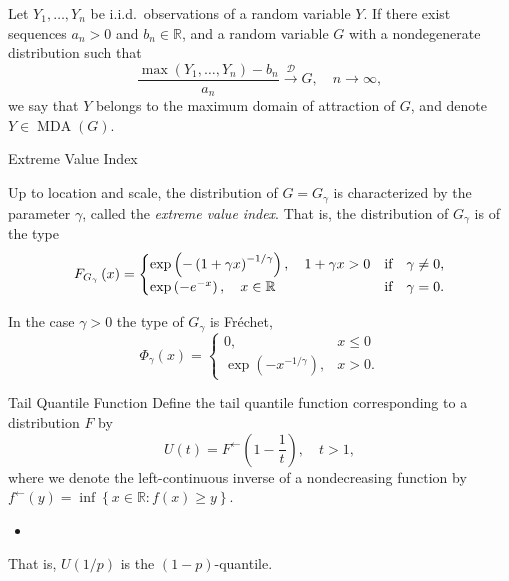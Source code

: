 \documentclass[11pt, aspectratio=169]{beamer}
\DeclareMathOperator{\mda}{MDA}
\begin{document}
\begin{frame}
  \begin{definition}
    Let $Y_1, \ldots, Y_n$ be i.i.d.\ observations of a random variable $Y$. If
    there exist sequences $a_n > 0$ and $b_n\in\mathbb{R}$, and a random
    variable $G$ with a nondegenerate distribution such that
    \begin{equation*}
	    \frac{\max\left(Y_1, \ldots, Y_n\right) - b_n}{a_n}
      \stackrel{\mathcal{D}}{\to} G, \quad n\to\infty,
    \end{equation*}
    we say that $Y$ belongs to the maximum domain of attraction of $G$, and
    denote $Y\in\mda\left(G\right)$.
  \end{definition}
\end{frame}


\begin{frame}{Extreme Value Index}
  \begin{theorem}
    Up to location and scale, the distribution of $G = G_\gamma$ is
    characterized by the parameter $\gamma$, called the \emph{extreme value
    index}. That is, the distribution of ${G_\gamma}$ is of the type
    \begin{equation*}
      F_{G_\gamma}\left(x\right) =
      \begin{cases}
        \exp\left(-\left(1 + \gamma x\right)^{-1/\gamma}\right),
        \quad 1 + \gamma x > 0 &\textnormal{if}\quad \gamma\neq 0, \\
        \exp\left(-e^{-x}\right),
        \quad x\in\mathbb{R} &\textnormal{if}\quad \gamma = 0.
      \end{cases}
    \end{equation*}
  \end{theorem}
  \pause
  In the case $\gamma > 0$ the type of $G_\gamma$ is Fr\'echet,
  \begin{equation*}
    \Phi_\gamma\left(x\right) =
    \begin{cases}
      0, & x\leq 0 \\
      \exp\left(-x^{-1/\gamma}\right), & x > 0.
    \end{cases}
  \end{equation*}
\end{frame}


\begin{frame}{Tail Quantile Function}
  Define the tail quantile function corresponding to a distribution $F$ by
  \begin{equation*}
    U\left(t\right) = F^{\leftarrow}\left(1 - \frac{1}{t}\right), \quad t > 1,
  \end{equation*}
  where we denote the left-continuous inverse of a nondecreasing function by
  $f^\leftarrow\left(y\right) = \inf\left\{x\in\mathbb{R} : f(x) \geq
  y\right\}$.
  \pause
  \begin{itemize}
    \item[] 
  \end{itemize}
  That is, $U\left(1/p\right)$ is the $(1-p)$-quantile.
\end{frame}
\end{document}
